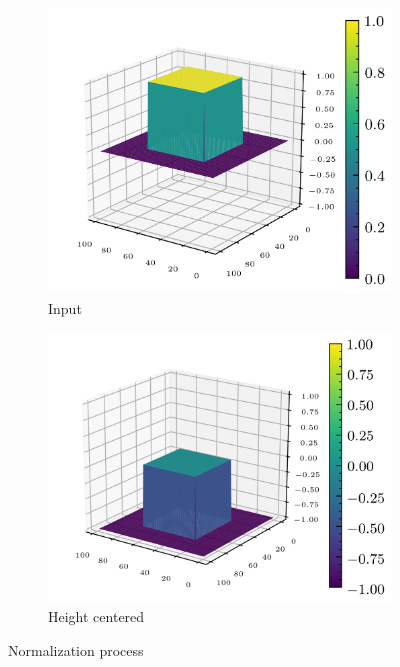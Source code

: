 \documentclass[../document.tex]{subfiles}
\begin{document}
\begin{figure}[H]
          \begin{subfigure}[b]{0.32\textwidth}
        \includegraphics[width=\textwidth]{../img/data-aug/3d/square-middle.png}
        \caption{Input}
    \end{subfigure}
    \begin{subfigure}[b]{0.32\textwidth}
        \includegraphics[width=\textwidth]{../img/data-aug/3d/square-middle-center.png}
        \caption{Height centered}
    \end{subfigure}  
\caption{Normalization process}
\label{fig: center}
\end{figure}
\end{document}
